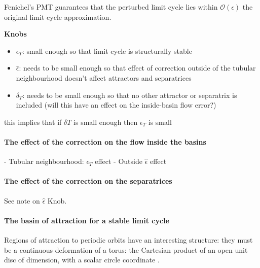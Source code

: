 \documentclass{article}
\theoremstyle{definition}
\theoremstyle{remark}
\newcounter{ct}
\begin{document}
Fenichel's PMT guarantees that the perturbed limit cycle lies within $\mathcal{O}(\epsilon)$ the original limit cycle approximation.




\textbf{Knobs}
\begin{itemize}
\item $\epsilon_T$: small enough so that limit cycle is structurally stable
\item $\hat\epsilon$: needs to be small enough so that effect of correction outside of the tubular neighbourhood doesn't affect attractors and separatrices
\item $\delta_T$: needs to be small enough so that no other attractor or separatrix is included (will this have an effect on the inside-basin flow error?)
\end{itemize}




this implies that if $\delta T$ is small enough then $\epsilon_T$ is small

\paragraph{The effect of the correction on the flow inside the basins}
- Tubular neighbourhood: $\epsilon_T$ effect
- Outside $\hat\epsilon$ effect


\paragraph{The effect of the correction on the separatrices}
See note on  $\hat\epsilon$ Knob.


\paragraph{The basin of attraction for a stable limit cycle}
Regions of attraction to periodic orbits have an interesting structure: they must be a continuous deformation of a torus: the Cartesian product of an open unit disc of dimension, with a scalar circle coordinate \citep{wilson1967structure}.
\end{document}
